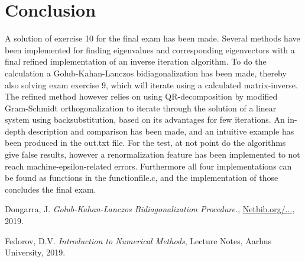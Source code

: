 \documentclass[twocolumn]{article}
\begin{document}
\section{\label{sec:9} Conclusion}
A solution of exercise 10 for the final exam has been made. Several methods have been implemented for finding eigenvalues and corresponding eigenvectors with a final refined implementation of an inverse iteration algorithm. To do the calculation a  Golub-Kahan-Lanczos bidiagonalization has been made, thereby also solving exam exercise 9, which will iterate using a calculated matrix-inverse. The refined method however relies on using QR-decomposition by modified Gram-Schmidt orthogonalization to iterate through the solution of a linear system using backsubstitution, based on its advantages for few iterations. An in-depth description and comparison has been made, and an intuitive example has been produced in the out.txt file. For the test, at not point do the algorithms give false results, however a renormalization feature has been implemented to not reach machine-epsilon-related errors. Furthermore all four implementations can be found as functions in the functionfile.c, and the implementation of those concludes the final exam.   


\begin{thebibliography}{9}

  Dongarra, J.
  \textit{Golub-Kahan-Lanczos Bidiagonalization Procedure.},
  \href{http://www.netlib.org/utk/people/JackDongarra/etemplates/node198.html}{Netbib.org/...},
  2019.
 
  Fedorov, D.V.
  \textit{Introduction to Numerical Methods},
  Lecture Notes, Aarhus University,
  2019.


\end{thebibliography}
\end{document}
